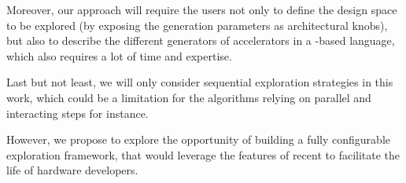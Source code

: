         Moreover, our approach will require the users not only to define the design space to be explored (by exposing the generation parameters as architectural knobs), but also to describe the different generators of accelerators in a -based language, which also requires a lot of time and expertise.

        Last but not least, we will only consider sequential exploration strategies in this work, which could be a limitation for the algorithms relying on parallel and interacting steps for instance.
        
        However, we propose to explore the opportunity of building a fully configurable exploration framework, that would leverage the features of recent  to facilitate the life of hardware developers.


